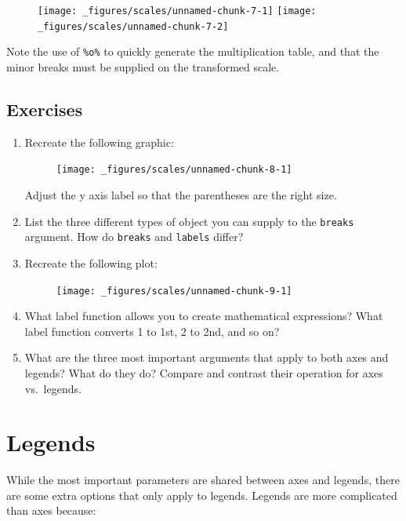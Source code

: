 \begin{figure}[H]
  \texttt{[image: \_figures/scales/unnamed-chunk-7-1]}%
  \texttt{[image: \_figures/scales/unnamed-chunk-7-2]}
\end{figure}

Note the use of \texttt{\%o\%} to quickly generate the multiplication
table, and that the minor breaks must be supplied on the transformed
scale. 

\subsection{Exercises}\label{exercises-1}

\begin{enumerate}
\def\labelenumi{\arabic{enumi}.}
\item
  Recreate the following graphic:

  \begin{figure}[H]
    \texttt{[image: \_figures/scales/unnamed-chunk-8-1]}
  \end{figure}

  Adjust the y axis label so that the parentheses are the right size.
\item
  List the three different types of object you can supply to the
  \texttt{breaks} argument. How do \texttt{breaks} and \texttt{labels}
  differ?
\item
  Recreate the following plot:

  \begin{figure}[H]
    \texttt{[image: \_figures/scales/unnamed-chunk-9-1]}
  \end{figure}
\item
  What label function allows you to create mathematical expressions?
  What label function converts 1 to 1st, 2 to 2nd, and so on?
\item
  What are the three most important arguments that apply to both axes
  and legends? What do they do? Compare and contrast their operation for
  axes vs.~legends.
\end{enumerate}

\hypertarget{sec:legends}{\section{Legends}\label{sec:legends}}

While the most important parameters are shared between axes and legends,
there are some extra options that only apply to legends. Legends are
more complicated than axes because: 

